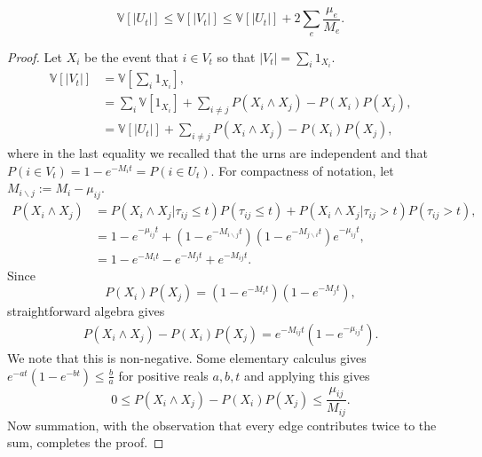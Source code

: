 \documentclass[10pt,a4paper]{amsart}
\begin{document}
\begin{proposition}\label{equi var ineq}
$$\mathbb{V}[|U_t|] \leq \mathbb{V}[|V_t|] \leq \mathbb{V}[|U_t|]+2\sum_{e}\frac{\mu_e}{M_e}.$$ 
\end{proposition}

\begin{proof}  Let $X_i$ be the event that $i \in V_t$ so that $|V_t|=\sum_i 1_{X_i}$. 
    \begin{align*}
        \mathbb{V}[|V_t|] &= \mathbb{V}\left[\sum_{i}1_{X_i}\right], \\
        &= \sum_i \mathbb{V}[1_{X_i}] + \sum_{i \neq j}P(X_i \wedge X_j)-P(X_i)P(X_j), \\
        &= \mathbb{V}[|U_t|]+\sum_{i \neq j}P(X_i \wedge X_j)-P(X_i)P(X_j),
    \end{align*} 
    where in the last equality we recalled that the urns are independent and that $P(i \in V_t) = 1-e^{-M_it}= P(i \in U_t)$.
For compactness of notation, let $M_{i \backslash j} := M_{i}-\mu_{ij}$.
\begin{align*}
    P(X_i \wedge X_j) &= P(X_i \wedge X_j|\tau_{ij} \leq t)P(\tau_{ij} \leq t)+P(X_i \wedge X_j | \tau_{ij} > t)P(\tau_{ij} > t), \\
    &= 1-e^{-\mu_{ij}t}+(1-e^{-M_{i \backslash j}t})(1-e^{-M_{j\backslash i}t})e^{-\mu_{ij}t}, \\
    &= 1-e^{-M_it}-e^{-M_jt}+e^{-M_{ij}t}.
\end{align*}
Since $$P(X_i)P(X_j) = (1-e^{-M_it})(1-e^{-M_jt}),$$ straightforward algebra gives \begin{align*}
    P(X_i \wedge X_j)-P(X_i)P(X_j) = e^{-M_{ij}t}(1-e^{-\mu_{ij}t}).
\end{align*} We note that this is non-negative. Some elementary calculus gives $e^{-at}(1-e^{-bt}) \leq \frac{b}{a}$ for positive reals $a,b,t$ and applying this gives
$$0 \leq P(X_i \wedge X_j)-P(X_i)P(X_j) \leq \frac{\mu_{ij}}{M_{ij}}.$$ Now summation, with the observation that every edge contributes twice to the sum, completes the proof.
\end{proof}
\end{document}
